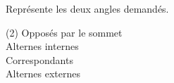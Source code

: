 %
%
    Représente les deux angles demandés.
    \begin{tasks}(2)
        \task Opposés par le sommet\\
        
        \task Alternes internes\\
        
        \task Correspondants\\
        
        \task Alternes externes\\
        
    \end{tasks}
